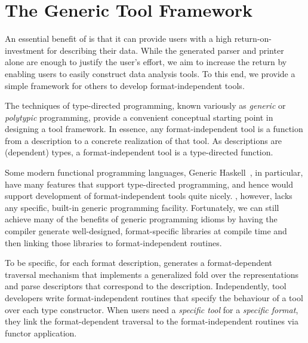 \documentclass{sigplanconf}
\begin{document}
%
\section{The Generic Tool Framework}
\label{sec:gen-tool}

An essential benefit of \padsml{} is that it can provide users with a
high return-on-investment for describing their data. While the
generated parser and printer alone are enough to justify the user's
effort, we aim to increase the return by enabling users to easily
construct data analysis tools.
To this end, we provide a simple framework for others to develop 
format-independent tools.

The techniques of type-directed programming, known variously as
\textit{generic} or \textit{polytypic} programming, provide a
convenient conceptual starting point in designing a tool framework.
In essence, any format-independent tool is a function from a description to 
a concrete realization of that tool. 
As \padsml{} descriptions are (dependent) types, a 
format-independent tool is a type-directed function.


Some modern functional programming languages,
Generic Haskell~\cite{hinze+:generic-haskell}, in particular,
have many features that support type-directed programming, and
hence would support development of format-independent tools quite nicely. 
\ocaml{}, however, lacks any specific, built-in generic programming facility.
Fortunately, we can still achieve many of the benefits of generic 
programming idioms by having the \padsml{} compiler generate
well-designed, format-specific libraries at compile time
and then linking those libraries to format-independent routines.

To be specific, for each format description, \padsml{} generates a
format-dependent traversal mechanism that implements a generalized
fold over the representations and parse descriptors that correspond to
the description. Independently, tool developers write format-independent
routines that specify the behaviour of a tool over each
\padsml{} type constructor. When users need a {\em specific tool} for a
{\em specific format}, they link the format-dependent 
traversal to the format-independent routines via 
functor application.
\end{document}
